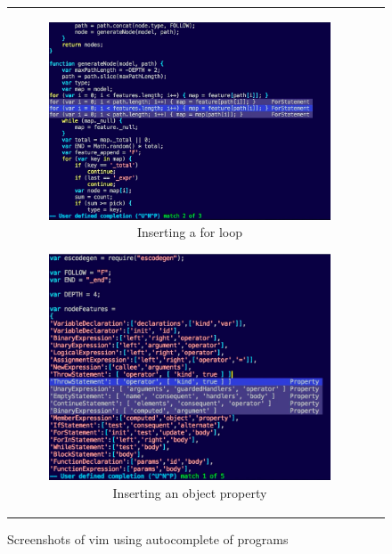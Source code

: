 \documentclass{article}
\begin{document}
\begin{figure}[h]
	\centering
	\begin{tabular}{c c}
		\begin{subfigure}[h]{6.25cm}
			\centering
			\includegraphics[width=1.00\textwidth]{vim1}
			\caption{Inserting a for loop} \label{fig:vim1}
		\end{subfigure}
		\begin{subfigure}[h]{6cm}
			\centering
			\includegraphics[width=1.00\textwidth]{vim2}
			\caption{Inserting an object property} \label{fig:vim2}
		\end{subfigure}
	\end{tabular}
	\caption{Screenshots of vim using autocomplete of programs}
\end{figure}
\end{document}

